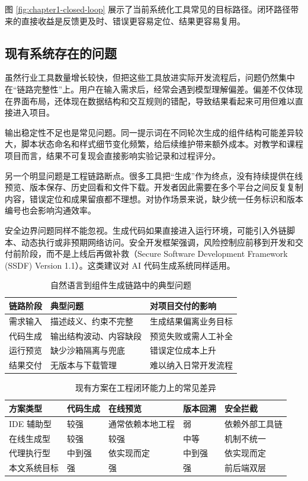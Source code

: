 图 \ref{fig:chapter1-closed-loop} 展示了当前系统化工具常见的目标路径。闭环路径带来的直接收益是反馈更及时、错误更容易定位、结果更容易复用。

\subsection{现有系统存在的问题}
虽然行业工具数量增长较快，但把这些工具放进实际开发流程后，问题仍然集中在“链路完整性”上。用户在输入需求后，经常会遇到模型理解偏差。偏差不仅体现在界面布局，还体现在数据结构和交互规则的错配，导致结果看起来可用但难以直接进入项目。

输出稳定性不足也是常见问题。同一提示词在不同轮次生成的组件结构可能差异较大，脚本状态命名和样式细节变化频繁，给后续维护带来额外成本。对教学和课程项目而言，结果不可复现会直接影响实验记录和过程评分。

另一个明显问题是工程链路断点。很多工具把“生成”作为终点，没有持续提供在线预览、版本保存、历史回看和文件下载。开发者因此需要在多个平台之间反复复制内容，错误定位和成果留痕都不理想。对协作场景来说，缺少统一任务标识和版本编号也会影响沟通效率。

安全边界问题同样不能忽视。生成代码如果直接进入运行环境，可能引入外链脚本、动态执行或非预期网络访问。安全开发框架强调，风险控制应前移到开发和交付前阶段，而不是上线后再做补救（Secure Software Development Framework (SSDF) Version 1.1）\cite{nistssdf2024}。这类建议对 AI 代码生成系统同样适用。

\begin{table}[htbp]
\centering
\caption{自然语言到组件生成链路中的典型问题}
\label{tab:chapter1-problem-flow}
\small
\begin{tabular}{@{}p{}p{}p{}@{}}
\toprule
链路阶段 & 典型问题 & 对项目交付的影响 \\
\midrule
需求输入 & 描述歧义、约束不完整 & 生成结果偏离业务目标 \\
代码生成 & 输出结构波动、内容缺段 & 预览失败或需人工补全 \\
运行预览 & 缺少沙箱隔离与兜底 & 错误定位成本上升 \\
结果交付 & 无版本与下载管理 & 难以纳入日常开发流程 \\
\bottomrule
\end{tabular}
\end{table}

\begin{table}[htbp]
\centering
\caption{现有方案在工程闭环能力上的常见差异}
\label{tab:chapter1-gap}
\small
\begin{tabular}{@{}p{}p{}p{}p{}p{}@{}}
\toprule
方案类型 & 代码生成 & 在线预览 & 版本回溯 & 安全拦截 \\
\midrule
IDE 辅助型 & 较强 & 通常依赖本地工程 & 弱 & 依赖外部工具链 \\
在线生成型 & 较强 & 较强 & 中等 & 机制不统一 \\
代理执行型 & 中到强 & 依实现而定 & 中到强 & 依实现而定 \\
本文系统目标 & 强 & 强 & 强 & 前后端双层 \\
\bottomrule
\end{tabular}
\end{table}

